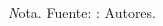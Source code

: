 \begin{adjustbox}{
            center,
             caption=[{Descripción de la fase 4}]{\centering Descripción de la fase 4. },
            label={Fase4},
            nofloat=table, vspace={20px}}
{\begin{threeparttable}
\begin{tabular}{|c|c|c|c|}
\end{tabular}
        \begin{tablenotes}
          \large \textit Nota. Fuente: : Autores.
        \end{tablenotes}
\end{threeparttable} 
}

\end{adjustbox}    